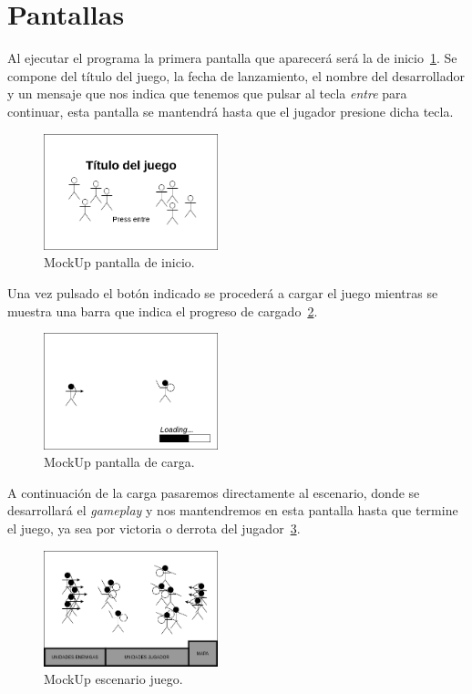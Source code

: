 \section{Pantallas}
Al ejecutar el programa la primera pantalla que aparecerá será la de 
inicio~\ref{mockup_ini}. Se compone del título del juego, la fecha de lanzamiento,
el nombre del desarrollador y un mensaje que nos indica que tenemos que pulsar al tecla
\textit{entre} para continuar, esta pantalla se mantendrá hasta que el jugador presione
dicha tecla.

\begin{figure}[ht]
\centering
\includegraphics[width=0.45\textwidth]{imagenes/gdd/pantallas/Pantalla_ini.png}
\caption{MockUp pantalla de inicio.}
\label{mockup_ini}
\end{figure}

Una vez pulsado el botón indicado se procederá a cargar el juego mientras se muestra
una barra que indica el progreso de cargado~\ref{mockup_carga}.

\begin{figure}[ht]
\centering
\includegraphics[width=0.45\textwidth]{imagenes/gdd/pantallas/Pantalla_carga.png}
\caption{MockUp pantalla de carga.}
\label{mockup_carga}
\end{figure}

A continuación de la carga pasaremos directamente al escenario, donde se desarrollará el
\textit{gameplay} y nos mantendremos en esta pantalla hasta que termine el juego, ya sea
por victoria o derrota del jugador~\ref{mockup_juego}.

\begin{figure}[ht]
\centering
\includegraphics[width=0.45\textwidth]{imagenes/gdd/pantallas/Pantalla_gameplay.png}
\caption{MockUp escenario juego.}
\label{mockup_juego}
\end{figure}

